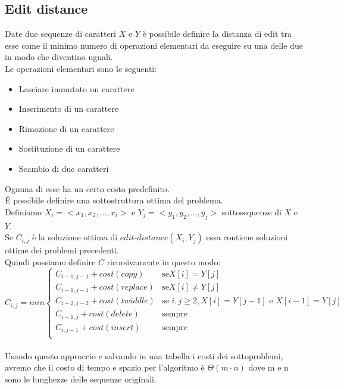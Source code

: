 \documentclass[]{article}
\begin{document}
\subsection{Edit distance}
Date due sequenze di caratteri $X$ e $Y$ è possibile definire la distanza di edit tra esse come il minimo numero di operazioni elementari da eseguire su una delle due in modo che diventino uguali.\\
Le operazioni elementari sono le seguenti:\\
\begin{itemize}
\item Lasciare immutato un carattere
\item Inserimento di un carattere
\item Rimozione di un carattere
\item Sostituzione di un carattere
\item Scambio di due caratteri
\end{itemize}
Ognuna di esse ha un certo costo predefinito.\\
\'E possibile definire una sottostruttura ottima del problema.\\
Definiamo $X_i=<x_1,x_2,...,x_i>$ e $Y_j=<y_1,y_2,...,y_j>$ sottosequenze di $X$ e $Y$.\\
Se $C_{i,j}$ è la soluzione ottima di $edit\mbox{-} distance(X_i,Y_j)$ essa contiene soluzioni ottime dei problemi precedenti.\\
Quindi possiamo definire $C$ ricorsivamente in questo modo:\\
\[
C_{i,j} = min
\begin{cases}
C_{i-1,j-1} + cost(copy)    & \mbox{se} X[i]=Y[j]\\
C_{i-1,j-1} + cost(replace) & \mbox{se} X[i]\neq Y[j]\\
C_{i-2,j-2} + cost(twiddle) & \mbox{se } i,j\geq 2, X[i]=Y[j-1] \mbox{ e } X[i-1]=Y[j]\\
C_{i-1,j} + cost(delete)    & \mbox{sempre}\\
C_{i,j-1} + cost(insert)    & \mbox{sempre} \\
\end{cases}
\]
\\
Usando questo approccio e salvando in una tabella i costi dei sottoproblemi, avremo che il costo di tempo e spazio per l'algoritmo è $\Theta(m\cdot n)$ dove m e n sono le lunghezze delle sequenze originali.\\
\end{document}
